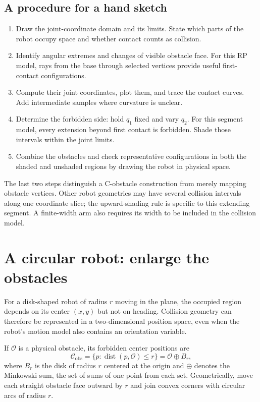 \subsection{A procedure for a hand sketch}
\begin{enumerate}
\item Draw the joint-coordinate domain and its limits. State which parts
of the robot occupy space and whether contact counts as collision.
\item Identify angular extremes and changes of visible obstacle face.
For this RP model, rays from the base through selected vertices provide
useful first-contact configurations.
\item Compute their joint coordinates, plot them, and trace the contact
curves. Add intermediate samples where curvature is unclear.
\item Determine the forbidden side: hold $q_1$ fixed and vary $q_2$.
For this segment model, every extension beyond first contact is forbidden.
Shade those intervals within the joint limits.
\item Combine the obstacles and check representative configurations in
both the shaded and unshaded regions by drawing the robot in physical space.
\end{enumerate}
The last two steps distinguish a C-obstacle construction from merely
mapping obstacle vertices. Other robot geometries may have several
collision intervals along one coordinate slice; the upward-shading rule
is specific to this extending segment. A finite-width arm also requires
its width to be included in the collision model.

\section{A circular robot: enlarge the obstacles}
For a disk-shaped robot of radius $r$ moving in the plane, the occupied
region depends on its center $(x,y)$ but not on heading. Collision geometry
can therefore be represented in a two-dimensional position space, even
when the robot's motion model also contains an orientation variable.

If $\mathcal O$ is a physical obstacle, its forbidden center positions are
\begin{equation}
 \mathcal C_{\mathrm{obs}}=
 \{p:\operatorname{dist}(p,\mathcal O)\le r\}
 =\mathcal O\oplus B_r,
 \label{eq:l13-inflation}
\end{equation}
where $B_r$ is the disk of radius $r$ centered at the origin and $\oplus$
denotes the Minkowski sum, the set of sums of one point from each set.
Geometrically, move each straight obstacle face outward by $r$ and join
convex corners with circular arcs of radius $r$.


